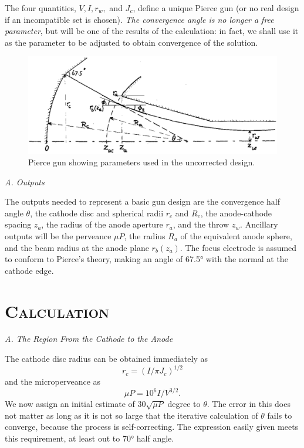 \documentclass[10pt,a4paper,UTF8,fleqn]{article}
\begin{document}
The four quantities, $ V,I, r_w, $ and $ J_c $, define a unique Pierce gun (or no real design if an incompatible set is chosen). \textit{The convergence angle is no longer a free parameter}, but will be one of the results of the calculation: in fact, we shall use it as the parameter to be adjusted to obtain convergence of the solution.
\begin{figure}[t]
	\centering
	\includegraphics[width=0.99\linewidth]{figure/fig1}
	\caption{\small Pierce gun showing parameters used in the uncorrected design.}
	\label{fig1}
\end{figure}

\vspace{2ex}\textit{A. Outputs}\vspace{0.5ex}

The outputs needed to represent a basic gun design are the convergence half angle $ \theta $, the cathode disc and spherical radii $ r_c $ and $ R_c $, the anode-cathode spacing $ z_a $, the radius of the anode aperture $ r_a $, and the throw $ z_w $. Ancillary outputs will be the perveance $ \mu P $, the radius $ R_a $ of the equivalent anode sphere, and the beam radius at the anode plane $ r_b(z_a) $. The focus electrode is assumed to conform to Pierce's theory, making an angle of \ang{67.5} with the normal at the cathode edge.

\section{\textsc{Calculation}}
\textit{A. The Region From the Cathode to the Anode}\vspace{0.5ex}

The cathode disc radius can be obtained immediately as 
\begin{equation}
	r_c = (I/\pi J_c)^{1/2}
\end{equation}
and the microperveance as
\begin{equation} \label{eq:2}
	\mu P = 10^6 I/V^{3/2}.
\end{equation}
We now assign an initial estimate of $ 30\sqrt{\mu P} $ degree to $ \theta $. The error in this does not matter as long as it is not so large that the iterative calculation of $ \theta $ fails to converge, because the process is self-correcting. The expression easily given meets this requirement, at least out to \ang{70} half angle.
\end{document}
